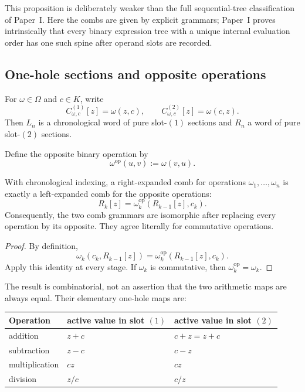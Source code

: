 This proposition is deliberately weaker than the full sequential-tree
classification of Paper~I.  Here the combs are given by explicit grammars;
Paper~I proves intrinsically that every binary expression tree with a unique
internal evaluation order has one such spine after operand slots are recorded.

\subsection{One-hole sections and opposite operations}

For $\omega\in\Omega$ and $c\in K$, write
\[
  C^{(1)}_{\omega,c}[z]=\omega(z,c),
  \qquad
  C^{(2)}_{\omega,c}[z]=\omega(c,z).
\]
Then $L_n$ is a chronological word of pure slot-$(1)$ sections and $R_n$ a
word of pure slot-$(2)$ sections.

Define the opposite binary operation by
\[
  \omega^{\mathrm{op}}(u,v):=\omega(v,u).
\]

\begin{proposition}
\label{prop:p0-comb-opposition}
With chronological indexing, a right-expanded comb for operations
$\omega_1,\ldots,\omega_n$ is exactly a left-expanded comb for the opposite
operations:
\[
  R_k[z]
  =\omega_k^{\mathrm{op}}(R_{k-1}[z],c_k).
\]
Consequently, the two comb grammars are isomorphic after replacing every
operation by its opposite.  They agree literally for commutative operations.
\end{proposition}

\begin{proof}
By definition,
\[
  \omega_k(c_k,R_{k-1}[z])
  =\omega_k^{\mathrm{op}}(R_{k-1}[z],c_k).
\]
Apply this identity at every stage.  If $\omega_k$ is commutative, then
$\omega_k^{\mathrm{op}}=\omega_k$.
\end{proof}

The result is combinatorial, not an assertion that the two arithmetic maps are
always equal.  Their elementary one-hole maps are:

\begin{center}
\renewcommand{\arraystretch}{1.35}
\begin{tabular}{lll}
\toprule
Operation & active value in slot $(1)$ & active value in slot $(2)$ \\
\midrule
addition & $z+c$ & $c+z=z+c$ \\
subtraction & $z-c$ & $c-z$ \\
multiplication & $cz$ & $cz$ \\
division & $z/c$ & $c/z$ \\
\bottomrule
\end{tabular}
\end{center}

